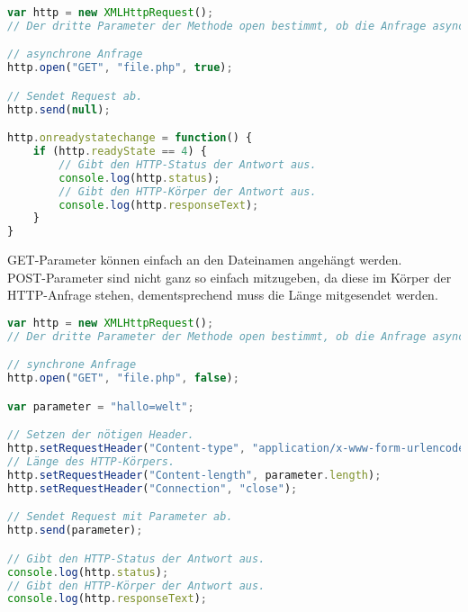 \begin{lstlisting}[style=custom, language=JavaScript,  caption={Asynchrones AJAX},label={lst:content_ajax_1}]
var http = new XMLHttpRequest();
// Der dritte Parameter der Methode open bestimmt, ob die Anfrage asynchron sein soll.

// asynchrone Anfrage
http.open("GET", "file.php", true);

// Sendet Request ab.
http.send(null);

http.onreadystatechange = function() {
	if (http.readyState == 4) {
		// Gibt den HTTP-Status der Antwort aus.
		console.log(http.status);
		// Gibt den HTTP-Körper der Antwort aus.
		console.log(http.responseText);
	}
}
\end{lstlisting}
GET-Parameter können einfach an den Dateinamen angehängt werden.\\
POST-Parameter sind nicht ganz so einfach mitzugeben, da diese im Körper der HTTP-Anfrage stehen, dementsprechend muss die Länge mitgesendet werden.
\begin{lstlisting}[style=custom, language=JavaScript,  caption={Synchrones AJAX mit POST-Parameter},label={lst:content_ajax_2}]
var http = new XMLHttpRequest();
// Der dritte Parameter der Methode open bestimmt, ob die Anfrage asynchron sein soll.

// synchrone Anfrage
http.open("GET", "file.php", false);

var parameter = "hallo=welt";

// Setzen der nötigen Header.
http.setRequestHeader("Content-type", "application/x-www-form-urlencoded");
// Länge des HTTP-Körpers.
http.setRequestHeader("Content-length", parameter.length);
http.setRequestHeader("Connection", "close");

// Sendet Request mit Parameter ab.
http.send(parameter);

// Gibt den HTTP-Status der Antwort aus.
console.log(http.status);
// Gibt den HTTP-Körper der Antwort aus.
console.log(http.responseText);
\end{lstlisting}